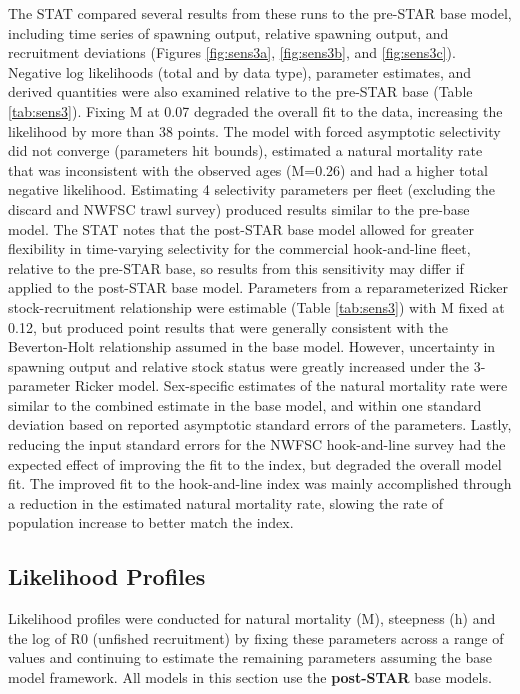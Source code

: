 \documentclass[
  english,
  a4paper,
]{article}
\begin{document}
The STAT compared several results from these runs to the pre-STAR base model, including time series of spawning output, relative spawning output, and recruitment deviations (Figures \ref{fig:sens3a}, \ref{fig:sens3b}, and \ref{fig:sens3c}). Negative log likelihoods (total and by data type), parameter estimates, and derived quantities were also examined relative to the pre-STAR base (Table \ref{tab:sens3}). Fixing M at 0.07 degraded the overall fit to the data, increasing the likelihood by more than 38 points. The model with forced asymptotic selectivity did not converge (parameters hit bounds), estimated a natural mortality rate that was inconsistent with the observed ages (M=0.26) and had a higher total negative likelihood. Estimating 4 selectivity parameters per fleet (excluding the discard and NWFSC trawl survey) produced results similar to the pre-base model. The STAT notes that the post-STAR base model allowed for greater flexibility in time-varying selectivity for the commercial hook-and-line fleet, relative to the pre-STAR base, so results from this sensitivity may differ if applied to the post-STAR base model. Parameters from a reparameterized Ricker stock-recruitment relationship were estimable (Table \ref{tab:sens3}) with M fixed at 0.12, but produced point results that were generally consistent with the Beverton-Holt relationship assumed in the base model. However, uncertainty in spawning output and relative stock status were greatly increased under the 3-parameter Ricker model. Sex-specific estimates of the natural mortality rate were similar to the combined estimate in the base model, and within one standard deviation based on reported asymptotic standard errors of the parameters. Lastly, reducing the input standard errors for the NWFSC hook-and-line survey had the expected effect of improving the fit to the index, but degraded the overall model fit. The improved fit to the hook-and-line index was mainly accomplished through a reduction in the estimated natural mortality rate, slowing the rate of population increase to better match the index.

\hypertarget{likelihood-profiles}{%
\subsection{Likelihood Profiles}\label{likelihood-profiles}}

Likelihood profiles were conducted for natural mortality (M), steepness (h) and the log of R0 (unfished recruitment) by fixing these parameters across a range of values and continuing to estimate the remaining parameters assuming the base model framework. All models in this section use the \textbf{post-STAR} base models.
\end{document}
